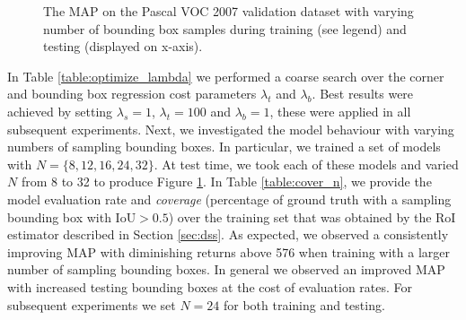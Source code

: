 \documentclass[10pt,twocolumn]{article}
\begin{document}
\begin{figure}[tb] 
\caption{The MAP on the Pascal VOC 2007 validation dataset with varying number of bounding box samples during training (see legend) and testing (displayed on x-axis).}
\label{fig:scale_n}
\end{figure}
In Table \ref{table:optimize_lambda} we performed a coarse search over the corner and bounding box regression cost parameters $\lambda_t$ and $\lambda_b$. Best results were achieved by setting $\lambda_s=1$, $\lambda_t=100$ and $\lambda_b=1$, these were applied in all subsequent experiments. Next, we investigated the model behaviour with varying numbers of sampling bounding boxes. In particular, we trained a set of models with $N=\lbrace 8, 12, 16, 24, 32 \rbrace$.  At test time, we took each of these models and varied $N$ from 8 to 32 to produce Figure \ref{fig:scale_n}. In Table \ref{table:cover_n}, we provide the model evaluation rate and \textit{coverage} (percentage of ground truth with a sampling bounding box with $\mathrm{IoU} > 0.5$) over the training set that was obtained by the RoI estimator described in Section \ref{sec:dss}. As expected, we observed a consistently improving MAP with diminishing returns above 576 when training with a larger number of sampling bounding boxes. In general we observed an improved MAP with increased testing bounding boxes at the cost of evaluation rates. For subsequent experiments we set $N=24$ for both training and testing.   
\end{document}
